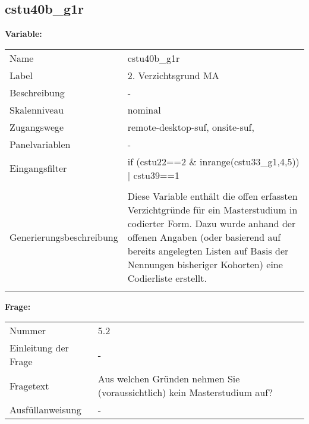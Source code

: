 	
	
	\subsection{cstu40b\_g1r}
	\label{subSection:cstu40b_g1r}

	\noindent\textbf{Variable:}\\
		\begin{tabular}{lL{11.3cm}}
			\label{tableVariable:cstu40b_g1r}
			Name & cstu40b\_g1r \\
			Label & 2. Verzichtsgrund MA \\
			Beschreibung & - \\
			Skalenniveau & nominal \\
			Zugangswege &
				remote-desktop-suf,
				onsite-suf,
 \\
			Panelvariablen & -
			 \\
			Eingangsfilter & if (cstu22==2 \& inrange(cstu33\_g1,4,5)) | cstu39==1 \\
 \\
					Generierungsbeschreibung & Diese Variable enthält die offen erfassten Verzichtgründe für ein Masterstudium in codierter Form. Dazu wurde anhand der offenen Angaben (oder basierend auf bereits angelegten Listen auf Basis der Nennungen bisheriger Kohorten) eine Codierliste erstellt.
				 \\	
			 \\
		\end{tabular}

		\vspace*{1 cm}
		\noindent\textbf{Frage:}\\
		\begin{tabular}{lL{11.3cm}}
			\label{tableQuestion:cstu40b_g1r}
			Nummer & 5.2 \\
			Einleitung der Frage & - \\
			Fragetext & Aus welchen Gründen nehmen Sie (voraussichtlich) kein Masterstudium auf? \\
			Ausfüllanweisung & - \\
		\end{tabular}





